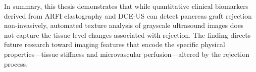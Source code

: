 In summary, this thesis demonstrates that while quantitative clinical biomarkers derived from ARFI elastography and DCE-US can detect pancreas graft rejection non-invasively, automated texture analysis of grayscale ultrasound images does not capture the tissue-level changes associated with rejection. The finding directs future research toward imaging features that encode the specific physical properties---tissue stiffness and microvascular perfusion---altered by the rejection process.

\newpage
